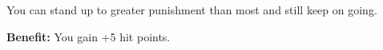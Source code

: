 
You can stand up to greater punishment than most and still keep on going.

\textbf{Benefit:} You gain +5 hit points.